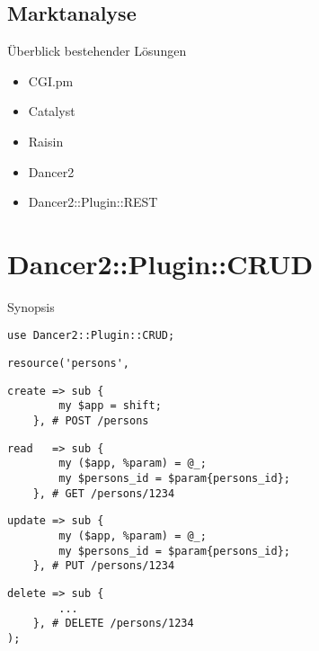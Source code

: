 
\subsection{Marktanalyse}


\begin{frame}{Überblick bestehender Lösungen}
    \begin{itemize}
        \item CGI.pm
        \pause
        \item Catalyst
        \pause
        \item Raisin
        \pause
        \item Dancer2
        \pause
        \item Dancer2::Plugin::REST
    \end{itemize}
\end{frame}


\section{Dancer2::Plugin::CRUD}


\begin{frame}[fragile]{Synopsis}

\begin{lstlisting}
use Dancer2::Plugin::CRUD;
\end{lstlisting}\pause\begin{lstlisting}[firstnumber=last]
resource('persons',
\end{lstlisting}\pause\begin{lstlisting}[firstnumber=last]
    create => sub {
        my $app = shift;
    }, # POST /persons
\end{lstlisting}\pause\begin{lstlisting}[firstnumber=last]
    read   => sub {
        my ($app, %param) = @_;
        my $persons_id = $param{persons_id};
    }, # GET /persons/1234
\end{lstlisting}\pause\begin{lstlisting}[firstnumber=last]
    update => sub {
        my ($app, %param) = @_;
        my $persons_id = $param{persons_id};
    }, # PUT /persons/1234
\end{lstlisting}\pause\begin{lstlisting}[firstnumber=last]
    delete => sub {
        ...
    }, # DELETE /persons/1234
);
\end{lstlisting}
\end{frame}

